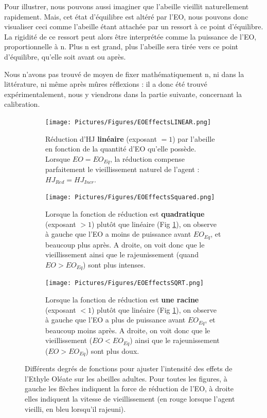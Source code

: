 	Pour illustrer, nous pouvons aussi imaginer que l'abeille vieillit naturellement rapidement. Mais, cet état d'équilibre est altéré par l'EO, nous pouvons donc visualiser ceci comme l'abeille étant attachée par un ressort à ce point d'équilibre. La rigidité de ce ressort peut alors être interprétée comme la puissance de l'EO, proportionnelle à n. Plus n est grand, plus l'abeille sera tirée vers ce point d'équilibre, qu'elle soit avant ou après.
	
	Nous n'avons pas trouvé de moyen de fixer mathématiquement n, ni dans la littérature, ni même après mûres réflexions : il a donc été trouvé expérimentalement, nous y viendrons dans la partie suivante, concernant la calibration.
	
	\begin{figure}
	\centering
	
	\begin{subfigure}{\textwidth}
	\centering
	\texttt{[image: Pictures/Figures/EOEffectsLINEAR.png]}
	\caption{Réduction d'HJ \textbf{linéaire} (exposant $= 1$) par l'abeille en fonction de la quantité d'EO qu'elle possède. Lorsque $EO = EO_{Eq}$, la réduction compense parfaitement le vieillissement naturel de l'agent : $HJ_{Red} = HJ_{Incr}$.}
	\label{eoLinear}
	\end{subfigure}
	
	\begin{subfigure}{\textwidth}
	\centering
	\texttt{[image: Pictures/Figures/EOEffectsSquared.png]}
	\caption{Lorsque la fonction de réduction est \textbf{quadratique} (exposant $> 1$) plutôt que linéaire (Fig \ref{eoLinear}), on observe à gauche que l'EO a moins de puissance avant $EO_{Eq}$, et beaucoup plus après. A droite, on voit donc que le vieillissement ainsi que le rajeunissement (quand $EO > EO_{Eq}$) sont plus intenses.}
	\label{eoSquared}
	\end{subfigure}
	
	\begin{subfigure}{\textwidth}
	\centering
	\texttt{[image: Pictures/Figures/EOEffectsSQRT.png]}
	\caption{Lorsque la fonction de réduction est \textbf{une racine} (exposant $< 1$) plutôt que linéaire (Fig \ref{eoLinear}), on observe à gauche que l'EO a plus de puissance avant $EO_{Eq}$, et beaucoup moins après. A droite, on voit donc que le vieillissement ($EO < EO_{Eq}$) ainsi que le rajeunissement ($EO > EO_{Eq}$) sont plus doux.}
	\label{eoSqrt}	
	\end{subfigure}
	
	\caption[Différents degrés de fonctions pour ajuster l'intensité des effets de l'Ethyle Oléate sur les abeilles adultes.]{Différents degrés de fonctions pour ajuster l'intensité des effets de l'Ethyle Oléate sur les abeilles adultes. Pour toutes les figures, à gauche les flèches indiquent la force de réduction de l'EO, à droite elles indiquent la vitesse de vieillissement (en rouge lorsque l'agent vieilli, en bleu lorsqu'il rajeuni).}	
	\label{eoAll}
	\end{figure}
	
